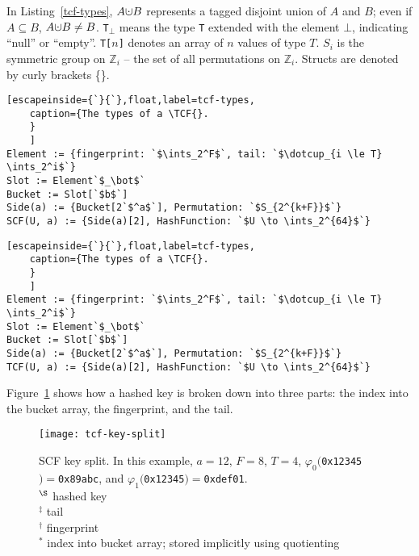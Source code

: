 \documentclass[letterpaper,twocolumn,10pt]{article}
\newcommand{\ints}{\mathbb{Z}}
\newcommand{\dotcup}{\ensuremath{\mathaccent\cdot\cup}}
\newcommand{\TCF}{SCF}
\newcommand{\TCF}{TCF}
\begin{document}
In Listing~\ref{tcf-types},       $A \dotcup B$ represents a tagged disjoint union of $A$ and $B$; even if $A \subseteq B$, $A \dotcup B \ne B$.
      \texttt{T}$_\bot$ means the type \texttt{T} extended with the element $\bot$, indicating ``null'' or ``empty''.
      \texttt{T[$n$]} denotes an array of $n$ values of type $T$.
      $S_i$ is the symmetric group on $\ints_i$ -- the set of all permutations on $\ints_i$.
      Structs are denoted by curly brackets \{\}. %

\ifanon
\begin{lstlisting}[escapeinside={`}{`},float,label=tcf-types,
    caption={The types of a \TCF{}.
    }
    ]
Element := {fingerprint: `$\ints_2^F$`, tail: `$\dotcup_{i \le T} \ints_2^i$`}
Slot := Element`$_\bot$`
Bucket := Slot[`$b$`]
Side(a) := {Bucket[2`$^a$`], Permutation: `$S_{2^{k+F}}$`}
SCF(U, a) := {Side(a)[2], HashFunction: `$U \to \ints_2^{64}$`}
\end{lstlisting}
\else
\begin{lstlisting}[escapeinside={`}{`},float,label=tcf-types,
    caption={The types of a \TCF{}.
    }
    ]
Element := {fingerprint: `$\ints_2^F$`, tail: `$\dotcup_{i \le T} \ints_2^i$`}
Slot := Element`$_\bot$`
Bucket := Slot[`$b$`]
Side(a) := {Bucket[2`$^a$`], Permutation: `$S_{2^{k+F}}$`}
TCF(U, a) := {Side(a)[2], HashFunction: `$U \to \ints_2^{64}$`}
\end{lstlisting}
\fi

Figure~\ref{tcf-key-split} shows how a hashed key is broken down into three parts: the index into the bucket array, the fingerprint, and the tail.

\begin{figure}[b!]
  \texttt{[image: tcf-key-split]}
\caption{\label{tcf-key-split}
\TCF{} key split.
In this example, $a = 12$, $F=8$, $T=4$, $\varphi_0(${\tt 0x12345}$) = ${\tt 0x89abc}, and $\varphi_1(${\tt 0x12345}$) = ${\tt 0xdef01}.\\
${}^\S$ hashed key\\
${}^\ddag$ tail \\
${}^\dag$ fingerprint \\
${}^*$ index into bucket array; stored implicitly using quotienting
}
\end{figure}
\end{document}
